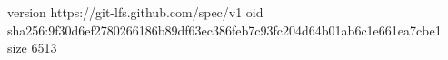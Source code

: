 version https://git-lfs.github.com/spec/v1
oid sha256:9f30d6ef2780266186b89df63ec386feb7c93fc204d64b01ab6c1e661ea7cbe1
size 6513
